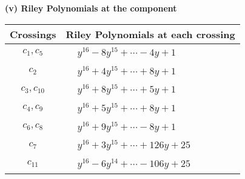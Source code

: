 \documentclass[1p]{elsarticle_modified}
\theoremstyle{definition}
\begin{document}
\newpage\renewcommand{\arraystretch}{1}
\flushleft \textbf{(v) Riley Polynomials at the component}\newline \\
\begin{tabular}{m{50pt}|m{274pt}}
Crossings & \hspace{64pt}Riley Polynomials at each crossing \\
\hline $$\begin{aligned}c_{1},c_{5}\end{aligned}$$&$\begin{aligned}
&y^{16}-8 y^{15}+\cdots-4 y+1
\end{aligned}$\\
\hline $$\begin{aligned}c_{2}\end{aligned}$$&$\begin{aligned}
&y^{16}+4 y^{15}+\cdots+8 y+1
\end{aligned}$\\
\hline $$\begin{aligned}c_{3},c_{10}\end{aligned}$$&$\begin{aligned}
&y^{16}+8 y^{15}+\cdots+5 y+1
\end{aligned}$\\
\hline $$\begin{aligned}c_{4},c_{9}\end{aligned}$$&$\begin{aligned}
&y^{16}+5 y^{15}+\cdots+8 y+1
\end{aligned}$\\
\hline $$\begin{aligned}c_{6},c_{8}\end{aligned}$$&$\begin{aligned}
&y^{16}+9 y^{15}+\cdots-8 y+1
\end{aligned}$\\
\hline $$\begin{aligned}c_{7}\end{aligned}$$&$\begin{aligned}
&y^{16}+3 y^{15}+\cdots+126 y+25
\end{aligned}$\\
\hline $$\begin{aligned}c_{11}\end{aligned}$$&$\begin{aligned}
&y^{16}-6 y^{14}+\cdots-106 y+25
\end{aligned}$\\
\hline
\end{tabular}\\~\\
\end{document}
